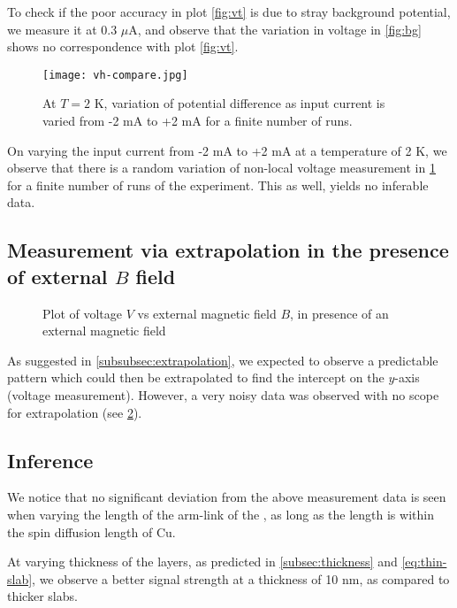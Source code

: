 To check if the poor accuracy in plot \ref{fig:vt} is due to stray background potential, we measure it at 0.3 \( \mu \)A, and observe that the variation in voltage in \cref{fig:bg} shows no correspondence with plot \ref{fig:vt}.

\begin{figure}[h]
    \texttt{[image: vh-compare.jpg]}
    \caption{At \( T = 2 \) K, variation of potential difference as input current is varied from -2 mA to +2 mA for a finite number of runs.}
    \label{fig:vh-compare}
\end{figure}

On varying the input current from -2 mA to +2 mA at a temperature of 2 K, we observe that there is a random variation of non-local voltage measurement in \cref{fig:vh-compare} for a finite number of runs of the experiment. This as well, yields no inferable data.

\subsection{Measurement via extrapolation in the presence of external \( B \) field}

\begin{figure}[h]
    
    \caption{Plot of voltage \( V \) vs external magnetic field \( B \), in presence of an external magnetic field}
    \label{fig:b-extrapolation}
\end{figure}

As suggested in \cref{subsubsec:extrapolation}, we expected to observe a predictable pattern which could then be extrapolated to find the intercept on the \( y \)-axis (voltage measurement).
However, a very noisy data was observed with no scope for extrapolation (see \cref{fig:b-extrapolation}).


\subsection{Inference}

We notice that no significant deviation from the above measurement data is seen when varying the length of the arm-link of the \Hst, as long as the length is within the spin diffusion length of Cu.

At varying thickness of the layers, as predicted in \cref{subsec:thickness} and \cref{eq:thin-slab}, we observe a better signal strength at a thickness of 10 nm, as compared to thicker slabs.
